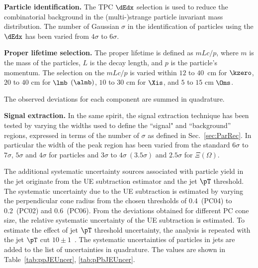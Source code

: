 \documentclass[ALICE,manyauthors]{cernphprep}
\begin{document}
\textbf{Particle identification.} The TPC $\dEdx$ selection is used to reduce the combinatorial background in the (multi-)strange particle invariant mass distribution.
The number of Gaussian $\sigma$ in the identification of particles using the $\dEdx$ has been varied from $4\sigma$ to $6\sigma$.

\textbf{Proper lifetime selection.} The proper lifetime is defined as $mLc/p$, where $m$ is the mass of the particles, $L$ is the decay length, and $p$ is the particle's momentum.
The selection on the $mLc/p$ is varied within $12$ to $40$~cm for $\kzero$, $20$ to $40$ cm for $\lmb$ $(\almb)$, $10$ to $30$ cm for $\Xis$, and $5$ to $15$ cm $\Oms$.

The observed deviations for each component are summed in quadrature.

\textbf{Signal extraction.} In the same spirit, the signal extraction technique has been tested by varying the widths used to define the ``signal" and ``background'' regions, expressed in terms of the number of $\sigma$ as defined in Sec.~\ref{sec:ParRec}.
In particular the width of the peak region has been varied from the standard $6\sigma$ to $7\sigma$, $5\sigma$ and $4\sigma$ for \Vzero particles and  $3\sigma$ to $4\sigma~(3.5\sigma)$ and $2.5\sigma$ for $\Xi(\Omega)$.

The additional systematic uncertainty sources associated with particle yield in the jet originate from the UE subtraction estimator and the jet $\pT$ threshold.
The systematic uncertainty due to the UE subtraction is estimated by varying the perpendicular cone radius from the chosen thresholds of 0.4~(PC04) to 0.2~(PC02) and 0.6~(PC06).
From the deviations obtained for different PC cone size, the relative systematic uncertainty of the UE subtraction is estimated.
To estimate the effect of jet $\pT$ threshold uncertainty, the analysis is repeated with the jet $\pT$ cut $10\pm 1$~\GeVc.
The systematic uncertainties of particles in jets are added to the list of uncertainties in quadrature.
The values are shown in Table~\ref{tab:ppJEUncer}, \ref{tab:pPbJEUncer}.
\end{document}

